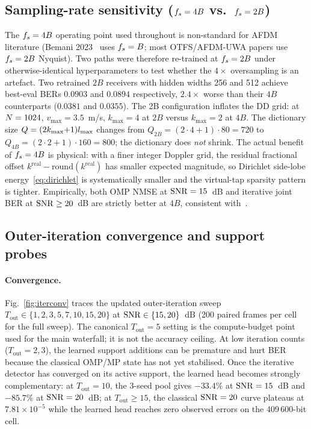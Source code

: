 \subsection{Sampling-rate sensitivity ($f_s=4B$ vs.\ $f_s=2B$)}
\label{ssec:exp_fs}
The $f_s=4B$ operating point used throughout is non-standard for AFDM
literature (Bemani 2023~\cite{bemani2023afdm} uses $f_s=B$; most
OTFS/AFDM-UWA papers use $f_s=2B$ Nyquist). Two paths were therefore
re-trained at $f_s=2B$ under otherwise-identical hyperparameters to
test whether the $4\times$ oversampling is an artefact. Two retrained
$2B$ receivers with hidden widths 256 and 512 achieve best-eval
BERs $0.0903$ and $0.0894$ respectively, $2.4\times$ worse than their
$4B$ counterparts ($0.0381$ and $0.0355$). The 2B configuration inflates
the DD grid: at $N=1024$, $v_{\max}=3.5$~m/s,
$k_{\max}=4$ at $2B$ versus $k_{\max}=2$ at $4B$. The dictionary size
$Q=(2k_{\max}{+}1)l_{\max}$ changes from $Q_{2B}=(2{\cdot}4{+}1)\cdot 80=720$
to $Q_{4B}=(2{\cdot}2{+}1)\cdot 160=800$; the dictionary does \emph{not} shrink.
The actual benefit of $f_s=4B$ is physical: with a finer integer Doppler grid,
the residual fractional offset $k^{\text{real}}-\mathrm{round}(k^{\text{real}})$
has smaller expected magnitude, so Dirichlet side-lobe energy~\eqref{eq:dirichlet}
is systematically smaller and the virtual-tap sparsity pattern is tighter.
Empirically, both OMP NMSE at $\mathrm{SNR}=15$~dB and iterative joint BER at $\mathrm{SNR}\geq 20$~dB
are strictly better at $4B$, consistent with~\cite{ma2024oversampledafdm}.

\subsection{Outer-iteration convergence and support probes}
\label{ssec:exp_probes}

\paragraph{Convergence.}
Fig.~\ref{fig:iterconv} traces the updated outer-iteration sweep
$T_\text{out}\in\{1,2,3,5,7,10,15,20\}$ at
$\mathrm{SNR}\in\{15,20\}$~dB (200 paired frames per cell for the full sweep).
The canonical $T_\text{out}=5$ setting is the compute-budget point used
for the main waterfall; it is not the accuracy ceiling. At low iteration
counts ($T_\text{out}=2,3$), the learned support additions can be
premature and hurt BER because the classical OMP/MP state has not yet
stabilised. Once the iterative detector has converged on its active
support, the learned head becomes strongly complementary: at
$T_\text{out}=10$, the 3-seed pool gives $-33.4\%$ at
$\mathrm{SNR}=15$~dB and $-85.7\%$ at $\mathrm{SNR}=20$~dB; at
$T_\text{out}\geq 15$, the classical $\mathrm{SNR}=20$ curve plateaus at
$7.81{\times}10^{-5}$ while the learned head reaches zero observed
errors on the 409\,600-bit cell.

